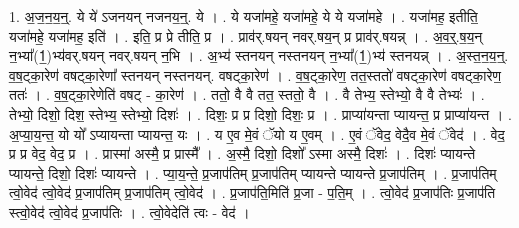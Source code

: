 \documentclass[17pt]{extarticle}
\begin{document}
1. अ॒ज॒न॒य॒न्॒. ये ये॑ ऽजनयन् नजनय॒न्॒. ये । . ये यजा॑महे॒ यजा॑महे॒ ये ये यजा॑महे । . यजा॑मह॒ इतीति॒ यजा॑महे॒ यजा॑मह॒ इति॑ । . इति॒ प्र प्रे तीति॒ प्र । . प्राव॑र्.षयन् नवर्.षय॒न् प्र प्राव॑र्.षयन्न् । . अ॒व॒र्॒.ष॒य॒न् न॒भ्या᳚(1॒)भ्य॑वर्.षयन् नवर्.षयन् न॒भि । . अ॒भ्य॑ स्तनयन् नस्तनयन् न॒भ्या᳚(1॒)भ्य॑ स्तनयन्न् । . अ॒स्त॒न॒य॒न्॒. व॒ष॒ट्का॒रेण॑ वषट्का॒रेणा᳚ स्तनयन् नस्तनयन्. वषट्का॒रेण॑ । . व॒ष॒ट्का॒रेण॒ तत॒स्ततो॑ वषट्का॒रेण॑ वषट्का॒रेण॒ ततः॑ । . व॒ष॒ट्का॒रेणेति॑ वषट् - का॒रेण॑ । . ततो॒ वै वै तत॒ स्ततो॒ वै । . वै तेभ्य॒ स्तेभ्यो॒ वै वै तेभ्यः॑ । . तेभ्यो॒ दिशो॒ दिश॒ स्तेभ्य॒ स्तेभ्यो॒ दिशः॑ । . दिशः॒ प्र प्र दिशो॒ दिशः॒ प्र । . प्राप्या॑यन्ता प्यायन्त॒ प्र प्राप्या॑यन्त । . अ॒प्या॒य॒न्त॒ यो यो᳚ ऽप्यायन्ता प्यायन्त॒ यः । . य ए॒व मे॒वं ॅयो य ए॒वम् । . ए॒वं ॅवेद॒ वेदै॒व मे॒वं ॅवेद॑ । . वेद॒ प्र प्र वेद॒ वेद॒ प्र । . प्रास्मा॑ अस्मै॒ प्र प्रास्मै᳚ । . अ॒स्मै॒ दिशो॒ दिशो᳚ ऽस्मा अस्मै॒ दिशः॑ । . दिशः॑ प्यायन्ते प्यायन्ते॒ दिशो॒ दिशः॑ प्यायन्ते । . प्या॒य॒न्ते॒ प्र॒जाप॑तिम् प्र॒जाप॑तिम् प्यायन्ते प्यायन्ते प्र॒जाप॑तिम् । . प्र॒जाप॑तिम् त्वो॒वेद॑ त्वो॒वेद॑ प्र॒जाप॑तिम् प्र॒जाप॑तिम् त्वो॒वेद॑ । . प्र॒जाप॑ति॒मिति॑ प्र॒जा - प॒ति॒म् । . त्वो॒वेद॑ प्र॒जाप॑तिः प्र॒जाप॑ति स्त्वो॒वेद॑ त्वो॒वेद॑ प्र॒जाप॑तिः । . त्वो॒वेदेति॑ त्वः - वेद॑ । \newline
\end{document}
